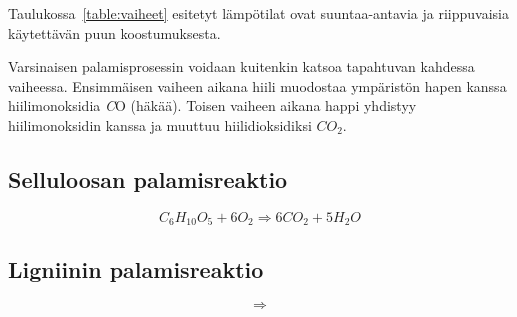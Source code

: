 Taulukossa~\ref{table:vaiheet} esitetyt lämpötilat ovat suuntaa-antavia ja
riippuvaisia käytettävän puun koostumuksesta.

Varsinaisen palamisprosessin voidaan kuitenkin katsoa tapahtuvan kahdessa vaiheessa.
Ensimmäisen vaiheen aikana hiili muodostaa ympäristön hapen kanssa hiilimonoksidia \textit CO (häkää).
Toisen vaiheen aikana happi yhdistyy hiilimonoksidin kanssa ja muuttuu hiilidioksidiksi \textit{\(CO_2\)}.

\subsection{Selluloosan palamisreaktio}

\begin{equation}
	C_{6}H_{10}O_{5} + 6O_{2} \Rightarrow 6CO_{2} + 5H_{2}O
\end{equation}

\subsection{Ligniinin palamisreaktio}

\begin{equation}
	\Rightarrow
\end{equation}
